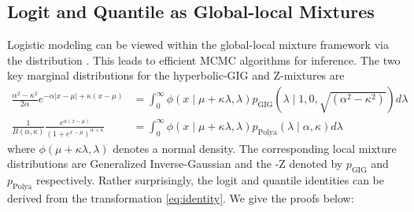 \documentclass[lineno]{biometrika}
\begin{document}
\subsection{Logit and Quantile as Global-local Mixtures}
Logistic modeling can be viewed within the global-local mixture framework via the \PG distribution \citep{polson2013bayesian}. This leads to efficient MCMC algorithms for inference. The two key marginal distributions for the hyperbolic-GIG and Z-\Polya mixtures \citep{polson2013bayesian,barndorff1982normal} are 
\begin{align}
\frac{\alpha^2-\kappa^2}{2\alpha} e^{-\alpha|x-\mu| + \kappa(x-\mu)} & = \int_0^{\infty} \phi(x \mid \mu + \kappa \lambda, \lambda) p_{\mathrm{GIG}}(\lambda \mid 1,0,\sqrt{(\alpha^2-\kappa^2)}) d\lambda \label{eq:GIG}\\
\frac{1}{B(\alpha,\kappa)} \frac{e^{\alpha(x-\mu)}}{(1+e^{x-\mu})^{\alpha + \kappa}} & = \int_0^{\infty} \phi( x \mid \mu + \kappa \lambda, \lambda) p_{\mathrm{Polya}}(\lambda \mid \alpha,\kappa)  d\lambda \label{eq:polya}
\end{align}
where $\phi(\mu + \kappa \lambda, \lambda)$ denotes a normal density. The corresponding local mixture distributions are Generalized Inverse-Gaussian and the \Polya-Z denoted by $p_{\mathrm{GIG}}$ and $p_{\mathrm{Polya}}$ respectively. Rather surprisingly, the logit and quantile identities can be derived from the \CS transformation \eqref{eq:identity}. We give the proofs below: 
\end{document}
